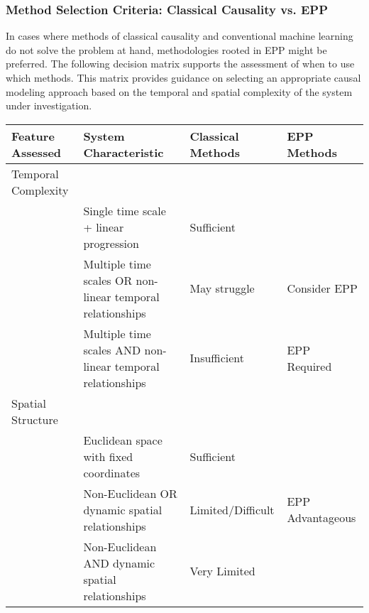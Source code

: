 \subsubsection{Method Selection Criteria: Classical Causality vs. EPP}

In cases where methods of classical causality and conventional machine learning do not solve the problem at hand, methodologies rooted in EPP might be preferred. The following decision matrix supports the assessment of when to use which methods. This matrix provides guidance on selecting an appropriate causal modeling approach based on the temporal and spatial complexity of the system under investigation.

\begin{table}[hb]
\begin{tabular}{llll}
Feature Assessed &
  System Characteristic &
  Classical Methods &
  EPP Methods \\ \hline
\multicolumn{1}{|l|}{Temporal Complexity} &
  \multicolumn{1}{l|}{} &
  \multicolumn{1}{l|}{} &
  \multicolumn{1}{l|}{} \\ \hline
\multicolumn{1}{|l|}{} &
  \multicolumn{1}{l|}{Single time scale + linear progression} &
  \multicolumn{1}{l|}{Sufficient} &
  \multicolumn{1}{l|}{} \\ \hline
\multicolumn{1}{|l|}{} &
  \multicolumn{1}{l|}{Multiple time scales OR non-linear temporal relationships} &
  \multicolumn{1}{l|}{May struggle} &
  \multicolumn{1}{l|}{Consider EPP} \\ \hline
\multicolumn{1}{|l|}{} &
  \multicolumn{1}{l|}{Multiple time scales AND non-linear temporal relationships} &
  \multicolumn{1}{l|}{Insufficient} &
  \multicolumn{1}{l|}{EPP Required} \\ \hline
\multicolumn{1}{|l|}{Spatial Structure} &
  \multicolumn{1}{l|}{} &
  \multicolumn{1}{l|}{} &
  \multicolumn{1}{l|}{} \\ \hline
\multicolumn{1}{|l|}{} &
  \multicolumn{1}{l|}{Euclidean space with fixed coordinates} &
  \multicolumn{1}{l|}{Sufficient} &
  \multicolumn{1}{l|}{} \\ \hline
\multicolumn{1}{|l|}{} &
  \multicolumn{1}{l|}{Non-Euclidean OR dynamic spatial relationships} &
  \multicolumn{1}{l|}{Limited/Difficult} &
  \multicolumn{1}{l|}{EPP Advantageous} \\ \hline
\multicolumn{1}{|l|}{} &
  \multicolumn{1}{l|}{Non-Euclidean AND dynamic spatial relationships} &
  \multicolumn{1}{l|}{Very Limited} &

\end{tabular}
\end{table}

